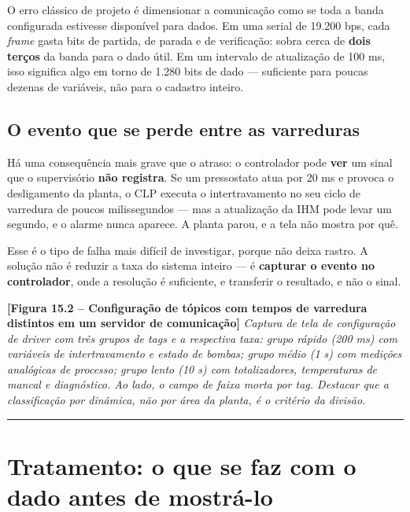 O erro clássico de projeto é dimensionar a comunicação como se toda a banda configurada estivesse
disponível para dados. Em uma serial de 19.200 bps, cada \emph{frame} gasta bits de partida, de parada e
de verificação: sobra cerca de \textbf{dois terços} da banda para o dado útil. Em um intervalo de
atualização de 100 ms, isso significa algo em torno de 1.280 bits de dado --- suficiente para poucas
dezenas de variáveis, não para o cadastro inteiro.

\subsection{O evento que se perde entre as varreduras}\label{o-evento-que-se-perde-entre-as-varreduras}

Há uma consequência mais grave que o atraso: o controlador pode \textbf{ver} um sinal que o supervisório
\textbf{não registra}. Se um pressostato atua por 20 ms e provoca o desligamento da planta, o CLP executa
o intertravamento no seu ciclo de varredura de poucos milissegundos --- mas a atualização da IHM pode
levar um segundo, e o alarme nunca aparece. A planta parou, e a tela não mostra por quê.

Esse é o tipo de falha mais difícil de investigar, porque não deixa rastro. A solução não é reduzir
a taxa do sistema inteiro --- é \textbf{capturar o evento no controlador}, onde a resolução é suficiente, e
transferir o resultado, e não o sinal.

\begin{caixafigura}

\textbf{{[}Figura 15.2 -- Configuração de tópicos com tempos de varredura distintos em um servidor de comunicação{]}}
\emph{Captura de tela de configuração de driver com três grupos de tags e a respectiva taxa: grupo rápido (200 ms) com variáveis de intertravamento e estado de bombas; grupo médio (1 s) com medições analógicas de processo; grupo lento (10 s) com totalizadores, temperaturas de mancal e diagnóstico. Ao lado, o campo de faixa morta por tag. Destacar que a classificação por dinâmica, não por área da planta, é o critério da divisão.}

\end{caixafigura}

\begin{center}\rule{0.5\linewidth}{0.5pt}\end{center}

\section{Tratamento: o que se faz com o dado antes de mostrá-lo}\label{tratamento-o-que-se-faz-com-o-dado-antes-de-mostruxe1-lo}

